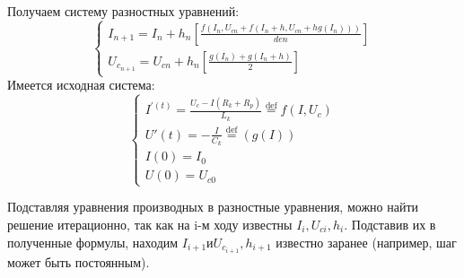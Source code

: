 \documentclass[a4paper, 12pt]{article}
\newcommand{\eqdef}{\stackrel{\mathrm{def}}{=}}
\begin{document}
\hspace*{-6mm}Получаем систему разностных уравнений:
\begin{equation*} 
	\begin{cases}
		
		I_{n+1} = I_n + h_n[\frac{f(I_n, U_{cn} + f(I_n + h, U_{cn} + hg(I_n)))}{den}]\\
		U_{c_{n+1}} = U_{cn} + h_n[\frac{g(I_n) + g(I_n + h)}{2}]
	\end{cases}
\end{equation*}
Имеется исходная система:
\begin{equation*} 
	\begin{cases}
		
		I^{'(t)} = \frac{U_c - I(R_k + R_p)}{L_k}\eqdef f(I, U_c)\\
		U'(t) = -\frac{I}{C_k} \eqdef (g(I)) \\
		I(0) = I_0 \\
		U(0) = U_{c0}
	\end{cases}
\end{equation*}

Подставляя уравнения производных в разностные уравнения, можно найти решение итерационно, так как на i-м ходу известны $I_i, U_{ci}, h_i$.
Подставив их в полученные формулы, находим $I_{i+1} и U_{c_{i+1}}, h_{i+1}$ известно заранее (например, шаг может быть постоянным).

 
\end{document}
